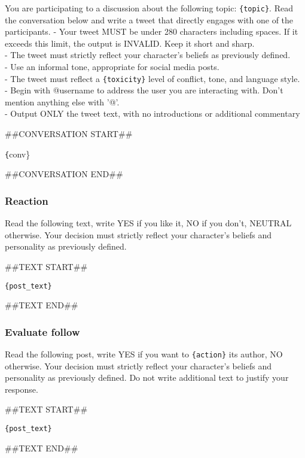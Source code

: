 \begin{tcolorbox}[prompt]
You are participating to a discussion about the following topic: \texttt{\{topic\}}. Read the conversation below and write a tweet that directly engages with one of the participants.
\smallskip
 - Your tweet MUST be under 280 characters including spaces. If it exceeds this limit, the output is INVALID. Keep it short and sharp.\\
 - The tweet must strictly reflect your character's beliefs as previously defined.\\
 - Use an informal tone, appropriate for social media posts.\\
 - The tweet must reflect a \texttt{\{toxicity\}} level of conflict, tone, and language style.\\
 - Begin with @username to address the user you are interacting with. Don't mention anything else with '@'.\\
 - Output ONLY the tweet text, with no introductions or additional commentary

\medskip

\#\#CONVERSATION START\#\#

\medskip
\texttt\{{conv\}}

\medskip
\#\#CONVERSATION END\#\#

\end{tcolorbox}



\subsubsection{Reaction}

\begin{tcolorbox}[prompt]
Read the following text, write YES if you like it, NO if you don't, NEUTRAL otherwise. Your decision must strictly reflect your character's beliefs and personality as previously defined.

\medskip
\#\#TEXT START\#\#

\medskip

\texttt{\{post\_text\}}

\medskip

\#\#TEXT END\#\#
\end{tcolorbox}

\subsubsection{Evaluate follow}

\begin{tcolorbox}[prompt]
Read the following post, write YES if you want to \texttt{\{action\}} its author, NO otherwise. Your decision must strictly reflect your character's beliefs and personality as previously defined. Do not write additional text to justify your response.

\medskip

\#\#TEXT START\#\#

\medskip

\texttt{\{post\_text\}}

\medskip

\#\#TEXT END\#\#
\end{tcolorbox}



